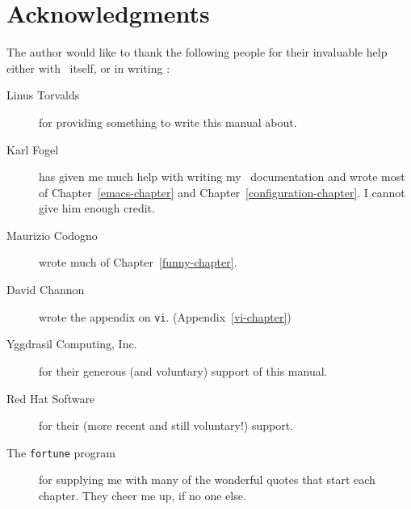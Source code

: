 \chapter*{Acknowledgments}

The author would like to thank the following people for their
invaluable help either with \linux\ itself, or in writing \uguide:

\begin{description}
\item [Linus Torvalds]  for providing something
to write this manual about.

\item [Karl Fogel]  has given me much help with
  writing my \linux\ documentation and wrote most of
  Chapter~\ref{emacs-chapter} and Chapter~\ref{configuration-chapter}.
  I cannot give him enough credit.

\item [Maurizio Codogno]  wrote much of
  Chapter~\ref{funny-chapter}.

\item [David Channon]  wrote the appendix on
  {\tt vi}. (Appendix~\ref{vi-chapter})

\item [Yggdrasil Computing, Inc.] for their generous (and voluntary) support
  of this manual.
  
\item [Red Hat Software] for their (more recent and still voluntary!)
  support.

\item [The {\tt fortune} program] for supplying me with many of the
  wonderful quotes that start each chapter.  They cheer me up, if no
  one else.
\end{description}
